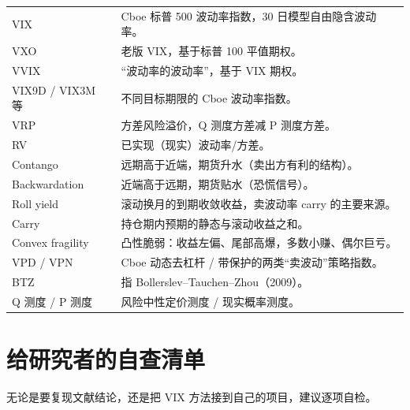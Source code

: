 \documentclass[11pt,a4paper]{ctexart}
\newenvironment{vtable}[1]
  {\begin{longtable}{#1}\toprule}
  {\bottomrule\end{longtable}}
\begin{document}
\begin{vtable}{>{\raggedright\arraybackslash}p{}>{\raggedright\arraybackslash}p{0.69\textwidth}}
VIX & Cboe 标普 500 波动率指数，30 日模型自由隐含波动率。\\
VXO & 老版 VIX，基于标普 100 平值期权。\\
VVIX & “波动率的波动率”，基于 VIX 期权。\\
VIX9D / VIX3M 等 & 不同目标期限的 Cboe 波动率指数。\\
VRP & 方差风险溢价，Q 测度方差减 P 测度方差。\\
RV & 已实现（现实）波动率/方差。\\
Contango & 远期高于近端，期货升水（卖出方有利的结构）。\\
Backwardation & 近端高于远期，期货贴水（恐慌信号）。\\
Roll yield & 滚动换月的到期收敛收益，卖波动率 carry 的主要来源。\\
Carry & 持仓期内预期的静态与滚动收益之和。\\
Convex fragility & 凸性脆弱：收益左偏、尾部高爆，多数小赚、偶尔巨亏。\\
VPD / VPN & Cboe 动态去杠杆 / 带保护的两类“卖波动”策略指数。\\
BTZ & 指 Bollerslev--Tauchen--Zhou（2009）。\\
Q 测度 / P 测度 & 风险中性定价测度 / 现实概率测度。\\
\end{vtable}

\section{给研究者的自查清单}

无论是要复现文献结论，还是把 VIX 方法接到自己的项目，建议逐项自检。
\end{document}
